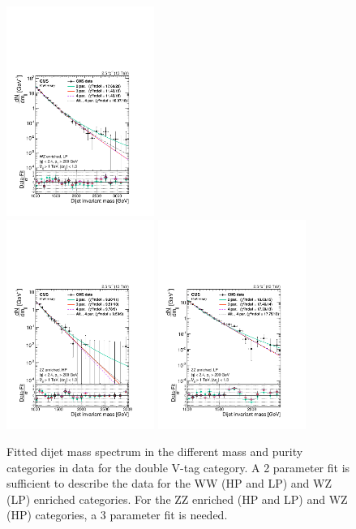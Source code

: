 \begin{figure}[h!]
\includegraphics[width=0.43\textwidth]{figures/analysis/search1/AN-15-211/ftest/no5par/WZLP_fitComp.pdf}\\
\includegraphics[width=0.43\textwidth]{figures/analysis/search1/AN-15-211/ftest/no5par/ZZHP_fitComp.pdf}
\includegraphics[width=0.43\textwidth]{figures/analysis/search1/AN-15-211/ftest/no5par/ZZLP_fitComp.pdf}\\
\caption{Fitted dijet mass spectrum in the different mass and purity categories in data for the double V-tag category. A 2 parameter fit is sufficient to describe the data for the WW (HP and LP) and WZ (LP) enriched categories. For the ZZ enriched (HP and LP) and WZ (HP) categories, a 3 parameter fit is needed.}
\label{fig:searchI:fit-dataVV}
\end{figure}

